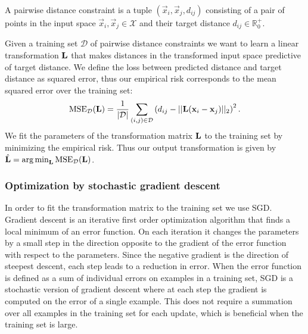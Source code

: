 A pairwise distance constraint is a tuple $(\vec{x}_i, \vec{x}_j, d_{ij})$ consisting of a pair of points in the input space $\vec{x}_i, \vec{x}_j \in \mathcal{X}$ and their target distance $d_{ij} \in \mathbb{R}_0^+$. 

Given a training set $\mathcal{D}$ of pairwise distance constraints we want to learn a linear transformation $\mathbf{L}$ that makes distances in the transformed input space predictive of target distance. We define the loss between predicted distance and target distance as squared error, thus our empirical risk corresponds to the mean squared error over the training set:
\begin{equation}
\text{MSE}_\mathcal{D}(\mathbf{L}) = \frac{1}{|\mathcal{D}|}\sum_{(i,j) \in \mathcal{D}} \left ( d_{ij} - ||\mathbf{L} (\mathbf{x}_i - \mathbf{x}_j)||_2 \right)^2.
\label{eq:mse}
\end{equation}
We fit the parameters of the transformation matrix $\mathbf{L}$ to the training set by minimizing the empirical risk. Thus our output transformation is given by $\hat{\mathbf{L}} = \operatorname*{arg\,min}_{\mathbf{L}} \text{MSE}_\mathcal{D}(\mathbf{L})$. 

\subsubsection{Optimization by stochastic gradient descent}

In order to fit the transformation matrix to the training set we use \acf{SGD}. Gradient descent is an iterative first order optimization algorithm that finds a local minimum of an error function. On each iteration it changes the parameters by a small step in the direction opposite to the gradient of the error function with respect to the parameters. Since the negative gradient is the direction of steepest descent, each step leads to a reduction in error. When the error function is defined as a sum of individual errors on examples in a training set, \ac{SGD} is a stochastic version of gradient descent where at each step the gradient is computed on the error of a single example. This does not require a summation over all examples in the training set for each update, which is beneficial when the training set is large. 

